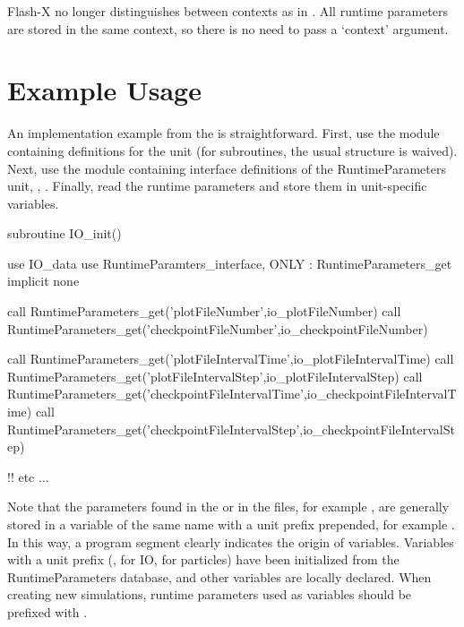 \begin{comment}
\begin{flashtip}
In \flashx, the user called the routine
\code{get\_parm\_from\_context} from within
\code{if(.firstcall.)} blocks from anywhere in the code.
From \flashx, code within the \code{if(.firstcall.)}
block is typically moved to the \code{Unit\_init.F90} file.
Put all calls
to \api{RuntimeParameters/RuntimeParameters_get} within this  initialization
routine.  Since the \code{\_init} routine for each unit
is only called once, \flashx eliminates the need to have messy
\code{if (.firstcall.)} brackets throughout the code.
\end{flashtip}
\end{comment}

\begin{flashtip}
Flash-X no longer distinguishes between contexts as in \flashx.  All runtime
parameters are stored in the same context, so there is no need to pass a
`context' argument.
\end{flashtip}



\section{Example Usage}
An implementation example from the  is
straightforward.  First, use the module containing definitions for the
unit (for  subroutines, the usual  structure is waived).  Next, use the module containing
interface definitions of the \unit{RuntimeParameters} unit, \ie, 
.
Finally, read the runtime
parameters and store them in unit-specific variables.
\begin{codeseg}
subroutine IO_init()

  use IO_data
  use RuntimeParamters_interface, ONLY : RuntimeParameters_get
  implicit none



  call RuntimeParameters_get('plotFileNumber',io_plotFileNumber)
  call RuntimeParameters_get('checkpointFileNumber',io_checkpointFileNumber)

  call RuntimeParameters_get('plotFileIntervalTime',io_plotFileIntervalTime)
  call RuntimeParameters_get('plotFileIntervalStep',io_plotFileIntervalStep)
  call RuntimeParameters_get('checkpointFileIntervalTime',io_checkpointFileIntervalTime)
  call RuntimeParameters_get('checkpointFileIntervalStep',io_checkpointFileIntervalStep)

  !! etc ...
\end{codeseg}
Note that the parameters found in the  or in the  files,
for example , are
generally stored in a variable of the same name with a unit prefix prepended, for example .
In this way, a program segment clearly indicates the origin of variables.
Variables with a unit prefix (\eg,  for \unit{IO},
 for particles) have been initialized from the \unit{RuntimeParameters} database, and other variables are locally declared.
When creating new simulations, runtime parameters used as variables should be prefixed with .

